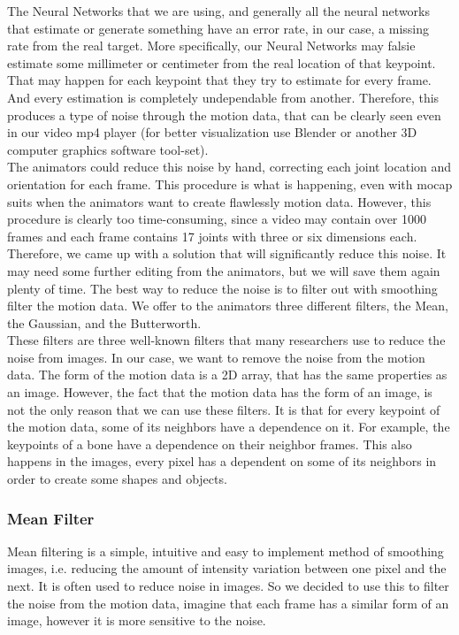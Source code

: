 The Neural Networks that we are using, and generally all the neural networks that estimate or generate something have an error rate, in our case, a missing rate from the real target. More specifically, our Neural Networks may falsie estimate some millimeter or centimeter from the real location of that keypoint. That may happen for each keypoint that they try to estimate for every frame. And every estimation is completely undependable from another. Therefore, this produces a type of noise through the motion data, that can be clearly seen even in our video mp4 player (for better visualization use Blender or another 3D computer graphics software tool-set). \\

The animators could reduce this noise by hand, correcting each joint location and orientation for each frame. This procedure is what is happening, even with mocap suits when the animators want to create flawlessly motion data. However, this procedure is clearly too time-consuming, since a video may contain over 1000 frames and each frame contains 17 joints with three or six dimensions each.\\

Therefore, we came up with a solution that will significantly reduce this noise. It may need some further editing from the animators, but we will save them again plenty of time. The best way to reduce the noise is to filter out with smoothing filter the motion data. We offer to the animators three different filters, the Mean, the Gaussian, and the Butterworth. \\

These filters are three well-known filters that many researchers use to reduce the noise from images. In our case, we want to remove the noise from the motion data. The form of the motion data is a 2D array, that has the same properties as an image. However, the fact that the motion data has the form of an image, is not the only reason that we can use these filters. It is that for every keypoint of the motion data, some of its neighbors have a dependence on it. For example, the keypoints of a bone have a dependence on their neighbor frames. This also happens in the images, every pixel has a dependent on some of its neighbors in order to create some shapes and objects.

\subsubsection*{Mean Filter}
Mean filtering \cite{Mean Filtering} is a simple, intuitive and easy to implement method of smoothing images, i.e. reducing the amount of intensity variation between one pixel and the next. It is often used to reduce noise in images. So we decided to use this to filter the noise from the motion data, imagine that each frame has a similar form of an image, however it is more sensitive to the noise.\\

